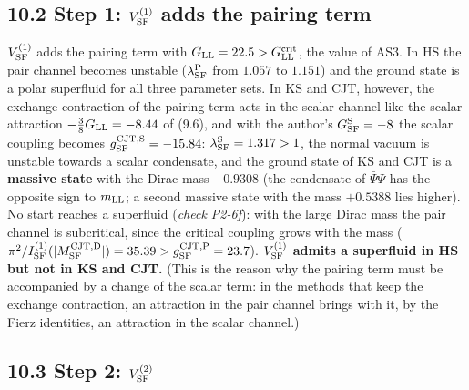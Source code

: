 \documentclass[
  10pt,
]{article}
\begin{document}
\hypertarget{step-1-v1_rm-sf-adds-the-pairing-term}{%
\subsection{\texorpdfstring{10.2 Step 1: \(V^{(1)}_{\rm SF}\) adds the
pairing
term}{10.2 Step 1: V\^{}\{(1)\}\_\{\textbackslash rm SF\} adds the pairing term}}\label{step-1-v1_rm-sf-adds-the-pairing-term}}

\(V^{(1)}_{\rm SF}\) adds the pairing term with
\(G_{\rm LL}=22.5>G^{\rm crit}_{\rm LL}\), the value of AS3. In HS the
pair channel becomes unstable (\(\lambda^{\rm P}_{\rm SF}\) from
\(1.057\) to \(1.151\)) and the ground state is a polar superfluid for
all three parameter sets. In KS and CJT, however, the exchange
contraction of the pairing term acts in the scalar channel like the
scalar attraction \(-\tfrac38G_{\rm LL}=-8.44\) of (9.6), and with the
author's \(G^{\rm S}_{\rm SF}=-8\) the scalar coupling becomes
\(g^{{\rm CJT},{\rm S}}_{\rm SF}=-15.84\):
\(\lambda^{\rm S}_{\rm SF}=1.317>1\), the normal vacuum is unstable
towards a scalar condensate, and the ground state of KS and CJT is a
\textbf{massive state} with the Dirac mass \(-0.9308\) (the condensate
of \(\bar\Psi\Psi\) has the opposite sign to \(m_{\rm LL}\); a second
massive state with the mass \(+0.5388\) lies higher). No start reaches a
superfluid (\emph{check P2-6f}): with the large Dirac mass the pair
channel is subcritical, since the critical coupling grows with the mass
(\(\pi^2/I^{(1)}_{\rm SF}(\lvert M^{{\rm CJT},{\rm D}}_{\rm SF}\rvert)=35.39>g^{{\rm CJT},{\rm P}}_{\rm SF}=23.7\)).
\textbf{\(V^{(1)}_{\rm SF}\) admits a superfluid in HS but not in KS and
CJT.} (This is the reason why the pairing term must be accompanied by a
change of the scalar term: in the methods that keep the exchange
contraction, an attraction in the pair channel brings with it, by the
Fierz identities, an attraction in the scalar channel.)

\hypertarget{step-2-v2_rm-sf}{%
\subsection{\texorpdfstring{10.3 Step 2:
\(V^{(2)}_{\rm SF}\)}{10.3 Step 2: V\^{}\{(2)\}\_\{\textbackslash rm SF\}}}\label{step-2-v2_rm-sf}}
\end{document}
